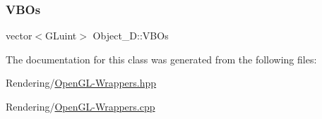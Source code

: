 \subsubsection{\texorpdfstring{V\+B\+Os}{VBOs}}
{\footnotesize\ttfamily vector$<$G\+Luint$>$ Object\+\_\+D\+::\+V\+B\+Os}



The documentation for this class was generated from the following files\+:\begin{DoxyCompactItemize}
\item 
Rendering/\mbox{\hyperlink{OpenGL-Wrappers_8hpp}{Open\+G\+L-\/\+Wrappers.\+hpp}}\item 
Rendering/\mbox{\hyperlink{OpenGL-Wrappers_8cpp}{Open\+G\+L-\/\+Wrappers.\+cpp}}\end{DoxyCompactItemize}
